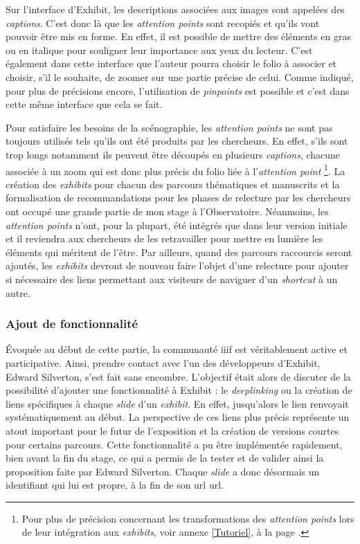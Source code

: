     Sur l'interface d'Exhibit, les descriptions associées aux images sont appelées des \textit{captions}. C'est donc là que les \textit{attention points} sont recopiés et qu'ils vont pouvoir être mis en forme. En effet, il est possible de mettre des éléments en gras ou en italique pour souligner leur importance aux yeux du lecteur. C'est également dans cette interface que l'auteur pourra choisir le folio à associer et choisir, s'il le souhaite, de zoomer sur une partie précise de celui. Comme indiqué, pour plus de précisions encore, l'utilisation de \textit{pinpoints} est possible et c'est dans cette même interface que cela se fait. 
    
    Pour satisfaire les besoins de la scénographie, les \textit{attention points} ne sont pas toujours utilisés tels qu'ils ont été produits par les chercheurs. En effet, s'ils sont trop longs notamment ils peuvent être découpés en plusieurs \textit{captions}, chacune associée à un zoom qui est donc plus précis du folio liée à l'\textit{attention point} \footnote{Pour plus de précision concernant les transformations des \textit{attention points} lors de leur intégration aux \textit{exhibits}, voir annexe \ref{Tutoriel}, à la page \pageref{Tutoriel}.}. La création des \textit{exhibits} pour chacun des parcours thématiques et manuscrits et la formalisation de recommandations pour les phases de relecture par les chercheurs ont occupé une grande partie de mon stage à l'Observatoire. Néanmoins, les \textit{attention points} n'ont, pour la plupart, été intégrés que dans leur version initiale et il reviendra aux chercheurs de les retravailler pour mettre en lumière les éléments qui méritent de l'être. Par ailleurs, quand des parcours raccourcis seront ajoutés, les \textit{exhibits} devront de nouveau faire l'objet d'une relecture pour ajouter si nécessaire des liens permettant aux visiteurs de naviguer d'un \textit{shortcut} à un autre. 
    
	\subsubsection{Ajout de fonctionnalité}
	Évoquée au début de cette partie, la communauté \acrshort{iiif} est véritablement active et participative. Ainsi, prendre contact avec l'un des développeurs d'Exhibit, Edward Silverton, s'est fait sans encombre. L'objectif était alors de discuter de la possibilité d'ajouter une fonctionnalité à Exhibit : le \textit{deeplinking} ou la création de liens spécifiques à chaque \textit{slide} d'un \textit{exhibit}. En effet, jusqu'alors le lien renvoyait systématiquement au début. La perspective de ces liens plus précis représente un atout important pour le futur de l'exposition et la création de versions courtes pour certains parcours. Cette fonctionnalité a pu être implémentée rapidement, bien avant la fin du stage, ce qui a permis de la tester et de valider ainsi la proposition faite par Edward Silverton. Chaque \textit{slide} a donc désormais un identifiant qui lui est propre, à la fin de son url \acrshort{url}. 
	
